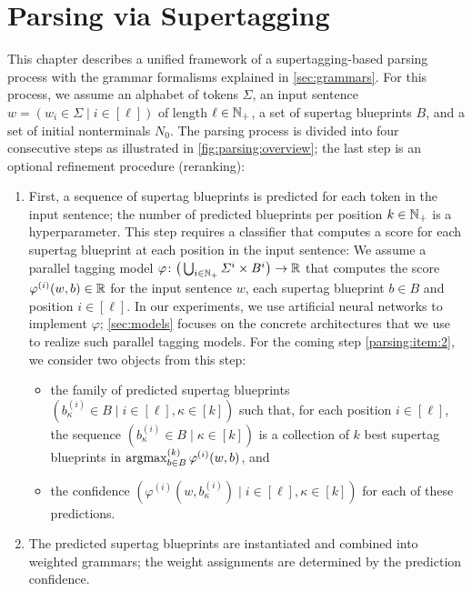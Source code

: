 \documentclass[../document.tex]{subfiles}
\begin{document}
    \chapter{Parsing via Supertagging}\label{chp:parsing}
    This chapter describes a unified framework of a supertagging-based parsing process with the grammar formalisms explained in \cref{sec:grammars}.
    For this process, we assume an alphabet of tokens \(\varSigma\), an input sentence \(w = (w_i \in \varSigma \mid i \in [\ell])\) of length \(\ell \in \mathbb{N}_+\), a set of supertag blueprints \(B\), and a set of initial nonterminals \(N_0\).
    The parsing process is divided into four consecutive steps as illustrated in \cref{fig:parsing:overview}; the last step is an optional refinement procedure (reranking):
    \begin{enumerate}
        \item\label{parsing:item:1}
            First, a sequence of supertag blueprints is predicted for each token in the input sentence; the number of predicted blueprints per position \(k \in \mathbb{N}_+\) is a hyperparameter.
            This step requires a classifier that computes a score for each supertag blueprint at each position in the input sentence:
                We assume a parallel tagging model \(\varphi\colon \big(\bigcup_{i\in \mathbb{N}_+} \varSigma^i \times B^i \big) \to \mathbb{R}\) that computes the score \(\varphi^{(i)}(w, b) \in \mathbb{R}\) for the input sentence \(w\), each supertag blueprint \(b \in B\) and position \(i \in [\ell]\).
            In our experiments, we use artificial neural networks to implement \(\varphi\); \cref{sec:models} focuses on the concrete architectures that we use to realize such parallel tagging models.
            For the coming step \ref{parsing:item:2}, we consider two objects from this step:
            \begin{itemize}
                \item the family of predicted supertag blueprints \((b^{(i)}_{\kappa} \in B \mid i \in [\ell], \kappa \in [k])\) such that, for each position \(i\in [\ell]\), the sequence \((b^{(i)}_{\kappa} \in B \mid \kappa \in [k])\) is a collection of \(k\) best supertag blueprints in \(\operatorname{arg max}^{(k)}_{b \in B} \varphi^{(i)}(w, b)\), and
                \item the confidence \((\varphi^{(i)}(w, b^{(i)}_{\kappa}) \mid i \in [\ell], \kappa \in [k])\) for each of these predictions.
            \end{itemize}
        \item\label{parsing:item:2}
            The predicted supertag blueprints are instantiated and combined into weighted grammars; the weight assignments are determined by the prediction confidence.

\end{enumerate}
\end{document}
